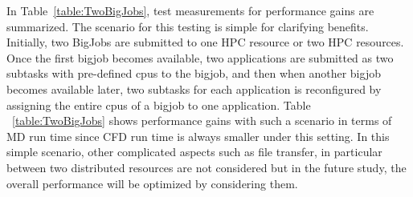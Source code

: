 \documentclass[conference,final]{IEEEtran}
\newcommand{\jhanote}[1]{ {\textcolor{red} { ***Jha: #1 }}}
\newcommand{\jhanote}[1]{}
\begin{document}
In Table~\ref{table:TwoBigJobs}, test measurements for performance gains are summarized. The scenario for this testing is simple for clarifying benefits.  Initially, two BigJobs are submitted to one HPC resource or two HPC resources.  Once the first bigjob becomes available, two applications are submitted as two subtasks with pre-defined cpus to the bigjob, and then when another bigjob becomes available later, two subtasks for each application is reconfigured by assigning the entire cpus of a bigjob to one application.  Table  ~\ref{table:TwoBigJobs} shows performance gains with such a scenario in terms of MD run time since CFD run time is always smaller under this setting.  In this simple scenario, other complicated aspects such as file transfer, in particular between two distributed resources are not considered but in the future study, the overall performance will be optimized by considering them.  

\end{document}
